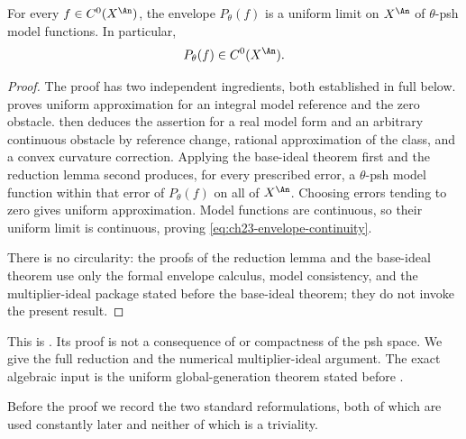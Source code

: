 \begin{theorem}\label{thm:bfj-envelope-regularity}
For every $f\in C^0(X^{\An})$, the envelope $P_\theta(f)$ is a uniform
limit on $X^{\An}$ of $\theta$-psh model functions.  In particular,
\begin{equation}\label{eq:ch23-envelope-continuity}
                         P_\theta(f)\in C^0(X^{\An}).
\end{equation}
\end{theorem}

\begin{proof}
The proof has two independent ingredients, both established in full below.
 proves uniform approximation for
an integral model reference and the zero obstacle.
 then deduces the assertion for a
real model form and an arbitrary continuous obstacle by reference change,
rational approximation of the class, and a convex curvature correction.
Applying the base-ideal theorem first and the reduction lemma second
produces, for every
prescribed error, a $\theta$-psh model function within that error of
$P_\theta(f)$ on all of $X^{\An}$.  Choosing errors tending to zero gives
uniform approximation.  Model functions are continuous, so their uniform
limit is continuous, proving \eqref{eq:ch23-envelope-continuity}.

There is no circularity: the proofs of the reduction lemma and the
base-ideal theorem use only the formal envelope calculus, model consistency,
and the multiplier-ideal package stated before the base-ideal theorem; they
do not invoke the present result.
\end{proof}

This is \cite[Theorem~8.3]{BFJ16}.  Its proof is not a consequence of
 or compactness of the psh space.  We give the full reduction
and the numerical multiplier-ideal argument.  The exact algebraic input is
the uniform global-generation theorem stated before
.

Before the proof we record the two standard reformulations, both of which are
used constantly later and neither of which is a triviality.

